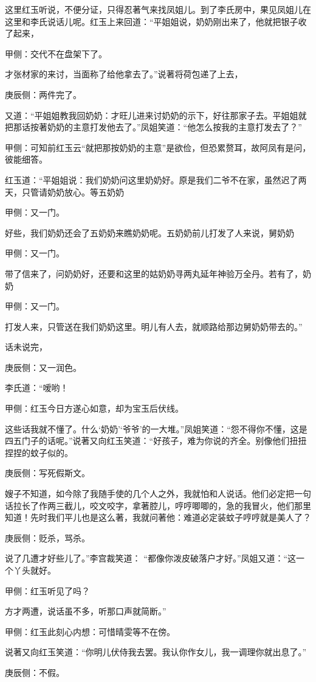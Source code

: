 \begin{parag}
    这里红玉听说，不便分证，只得忍著气来找凤姐儿。到了李氏房中，果见凤姐儿在这里和李氏说话儿呢。红玉上来回道：“平姐姐说，奶奶刚出来了，他就把银子收了起来，\begin{note}甲侧：交代不在盘架下了。\end{note}才张材家的来讨，当面称了给他拿去了。”说著将荷包递了上去，\begin{note}庚辰侧：两件完了。\end{note}又道：“平姐姐教我回奶奶：才旺儿进来讨奶奶的示下，好往那家子去。平姐姐就把那话按著奶奶的主意打发他去了。”凤姐笑道：“他怎么按我的主意打发去了？”\begin{note}甲侧：可知前红玉云“就把那按奶奶的主意”是欲俭，但恐累赘耳，故阿凤有是问，彼能细答。\end{note}红玉道：“平姐姐说：我们奶奶问这里奶奶好。原是我们二爷不在家，虽然迟了两天，只管请奶奶放心。等五奶奶\begin{note}甲侧：又一门。\end{note}好些，我们奶奶还会了五奶奶来瞧奶奶呢。五奶奶前儿打发了人来说，舅奶奶\begin{note}甲侧：又一门。\end{note}带了信来了，问奶奶好，还要和这里的姑奶奶寻两丸延年神验万全丹。若有了，奶奶\begin{note}甲侧：又一门。\end{note}打发人来，只管送在我们奶奶这里。明儿有人去，就顺路给那边舅奶奶带去的。”
\end{parag}


\begin{parag}
    话未说完，\begin{note}庚辰侧：又一润色。\end{note}李氏道：“嗳哟！\begin{note}甲侧：红玉今日方遂心如意，却为宝玉后伏线。\end{note}这些话我就不懂了。什么‘奶奶’‘爷爷’的一大堆。”凤姐笑道：“怨不得你不懂，这是四五门子的话呢。”说著又向红玉笑道：“好孩子，难为你说的齐全。别像他们扭扭捏捏的蚊子似的。\begin{note}庚辰侧：写死假斯文。\end{note}嫂子不知道，如今除了我随手使的几个人之外，我就怕和人说话。他们必定把一句话拉长了作两三截儿，咬文咬字，拿著腔儿，哼哼唧唧的，急的我冒火，他们那里知道！先时我们平儿也是这么著，我就问著他：难道必定装蚊子哼哼就是美人了？\begin{note}庚辰侧：贬杀，骂杀。\end{note}说了几遭才好些儿了。”李宫裁笑道： “都像你泼皮破落户才好。”凤姐又道：“这一个丫头就好。\begin{note}甲侧：红玉听见了吗？\end{note}方才两遭，说话虽不多，听那口声就简断。”\begin{note}甲侧：红玉此刻心内想：可惜晴雯等不在傍。\end{note}说著又向红玉笑道：“你明儿伏侍我去罢。我认你作女儿，我一调理你就出息了。”\begin{note}庚辰侧：不假。\end{note}
\end{parag}


